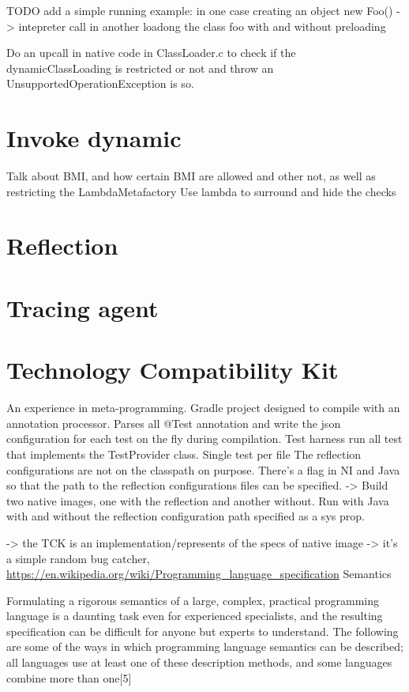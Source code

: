 TODO add a simple running example: in one case creating an object new Foo() -> intepreter call
in another loadong the class foo with and without preloading

Do an upcall in native code in ClassLoader.c to check if the dynamicClassLoading is restricted or not and throw an UnsupportedOperationException is so.

\section{Invoke dynamic}
Talk about BMI, and how certain BMI are allowed and other not, as well as restricting the LambdaMetafactory
Use lambda to surround and hide the checks
\section{Reflection}

\section{Tracing agent}

\section{Technology Compatibility Kit}
An experience in meta-programming.
Gradle project designed to compile with an annotation processor. Parses all @Test annotation and write the json configuration for each test on the fly
during compilation.
Test harness run all test that implements the TestProvider class. Single test per file
The reflection configurations are not on the classpath on purpose. There's a flag in NI and Java so that the path to the reflection configurations files can be specified.
-> Build two native images, one with the reflection and another without. Run with Java with and without the reflection configuration path specified as a sys prop.

-> the TCK is an implementation/represents of the specs of native image
-> it's a simple random bug catcher, 
\url{https://en.wikipedia.org/wiki/Programming_language_specification}
Semantics

Formulating a rigorous semantics of a large, complex, practical programming language is a daunting task even for experienced specialists, and the resulting specification can be difficult for anyone but experts to understand. The following are some of the ways in which programming language semantics can be described; all languages use at least one of these description methods, and some languages combine more than one[5]

